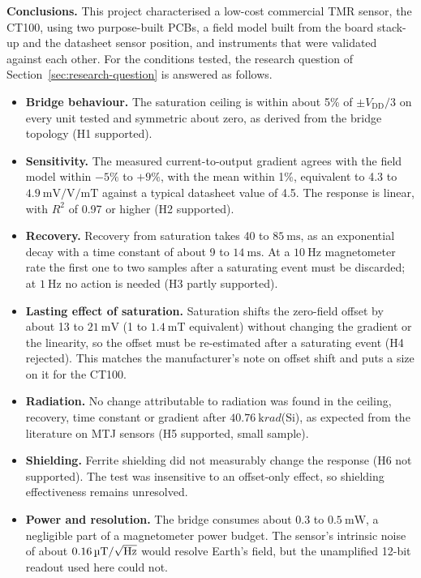 \documentclass[12pt,a4paper]{article}
\begin{document}
\textbf{Conclusions.} This project characterised a low-cost commercial TMR sensor, the CT100, using two purpose-built PCBs, a field model built from the board stack-up and the datasheet sensor position, and instruments that were validated against each other. For the conditions tested, the research question of Section~\ref{sec:research-question} is answered as follows.
\begin{itemize}
\item \textbf{Bridge behaviour.} The saturation ceiling is within about 5\% of $\pm V_{\text{DD}}/3$ on every unit tested and symmetric about zero, as derived from the bridge topology (H1 supported).
\item \textbf{Sensitivity.} The measured current-to-output gradient agrees with the field model within $-5\%$ to $+9\%$, with the mean within 1\%, equivalent to 4.3 to $\SI{4.9}{\milli\volt\per\volt\per\milli\tesla}$ against a typical datasheet value of 4.5. The response is linear, with $R^2$ of 0.97 or higher (H2 supported).
\item \textbf{Recovery.} Recovery from saturation takes 40 to $\SI{85}{\milli\second}$, as an exponential decay with a time constant of about 9 to $\SI{14}{\milli\second}$. At a $\SI{10}{\hertz}$ magnetometer rate the first one to two samples after a saturating event must be discarded; at $\SI{1}{\hertz}$ no action is needed (H3 partly supported).
\item \textbf{Lasting effect of saturation.} Saturation shifts the zero-field offset by about 13 to $\SI{21}{\milli\volt}$ (1 to $\SI{1.4}{\milli\tesla}$ equivalent) without changing the gradient or the linearity, so the offset must be re-estimated after a saturating event (H4 rejected). This matches the manufacturer's note on offset shift and puts a size on it for the CT100.
\item \textbf{Radiation.} No change attributable to radiation was found in the ceiling, recovery, time constant or gradient after $\SI{40.76}{\kilo rad}$(Si), as expected from the literature on MTJ sensors (H5 supported, small sample).
\item \textbf{Shielding.} Ferrite shielding did not measurably change the response (H6 not supported). The test was insensitive to an offset-only effect, so shielding effectiveness remains unresolved.
\item \textbf{Power and resolution.} The bridge consumes about 0.3 to $\SI{0.5}{\milli\watt}$, a negligible part of a magnetometer power budget. The sensor's intrinsic noise of about $\SI{0.16}{\micro\tesla\per\sqrt{\hertz}}$ would resolve Earth's field, but the unamplified 12-bit readout used here could not.
\end{itemize}
\end{document}
